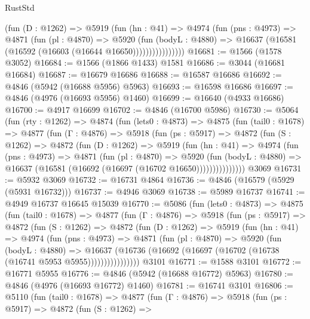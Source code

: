 \begin{lexlean}{RustStd}
\begin{coremodule}
                  (fun (D : @1262) =>
                  @5919
                    (fun (hn : @41) =>
                    @4974
                      (fun (pns : @4973) =>
                      @4871
                        (fun (pl : @4870) =>
                        @5920
                          (fun (bodyL : @4880) =>
                          @16637 (@16581 (@16592 (@16603 (@16644 @16650))))))))))))))))
@16681 := @1566 (@1578 @3052)
@16684 := @1566 (@1866 @1433) @1581
@16686 := @3044 (@16681 @16684)
@16687 := @16679 @16686
@16688 := @16587 @16686
@16692 := @4846 (@5942 (@16688 @5956) @5963)
@16693 := @16598 @16686
@16697 := @4846 (@4976 (@16693 @5956) @1460)
@16699 := @16640 (@4933 @16686)
@16700 := @4917 @16699
@16702 := @4846 (@16700 @5986)
@16730 := @5064
    (fun (rty : @1262) =>
    @4874
      (fun (lets0 : @4873) =>
      @4875
        (fun (tail0 : @1678) =>
        @4877
          (fun (Γ : @4876) =>
          @5918
            (fun (ps : @5917) =>
            @4872
              (fun (S : @1262) =>
              @4872
                (fun (D : @1262) =>
                @5919
                  (fun (hn : @41) =>
                  @4974
                    (fun (pns : @4973) =>
                    @4871
                      (fun (pl : @4870) =>
                      @5920
                        (fun (bodyL : @4880) =>
                        @16637 (@16581 (@16692 (@16697 (@16702 @16650)))))))))))))))
    @3069
@16731 := @5932 @3069
@16732 := @16731 @4864
@16736 := @4846 (@16579 (@5929 (@5931 @16732)))
@16737 := @4946 @3069
@16738 := @5989 @16737
@16741 := @4949 @16737 @16645 @15039
@16770 := @5086
    (fun (lets0 : @4873) =>
    @4875
      (fun (tail0 : @1678) =>
      @4877
        (fun (Γ : @4876) =>
        @5918
          (fun (ps : @5917) =>
          @4872
            (fun (S : @1262) =>
            @4872
              (fun (D : @1262) =>
              @5919
                (fun (hn : @41) =>
                @4974
                  (fun (pns : @4973) =>
                  @4871
                    (fun (pl : @4870) =>
                    @5920
                      (fun (bodyL : @4880) =>
                      @16637
                        (@16736 (@16692 (@16697 (@16702 (@16738 (@16741 @5953 @5955))))))))))))))))
    @3101
@16771 := @1588 @3101
@16772 := @16771 @5955
@16776 := @4846 (@5942 (@16688 @16772) @5963)
@16780 := @4846 (@4976 (@16693 @16772) @1460)
@16781 := @16741 @3101
@16806 := @5110
    (fun (tail0 : @1678) =>
    @4877
      (fun (Γ : @4876) =>
      @5918
        (fun (ps : @5917) =>
        @4872
          (fun (S : @1262) =>

\end{coremodule}
\end{lexlean}
